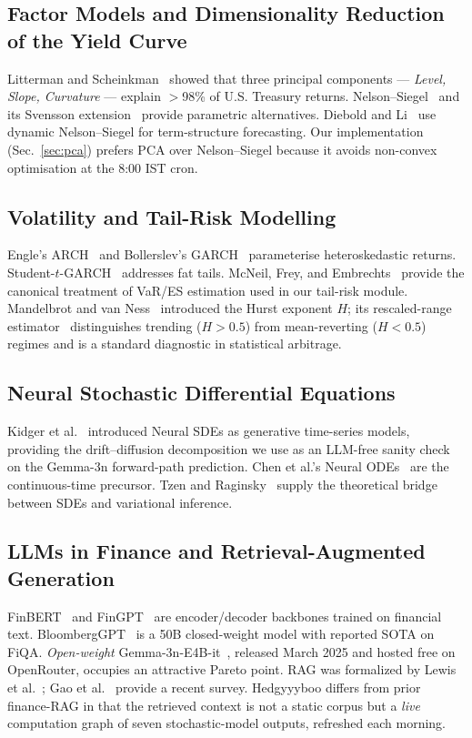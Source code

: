 \documentclass[conference]{IEEEtran}
\begin{document}
\subsection{Factor Models and Dimensionality Reduction of the Yield Curve}
Litterman and Scheinkman~\cite{litterman1991common} showed that three principal components --- \textit{Level, Slope, Curvature} --- explain $>$98\% of U.S. Treasury returns. Nelson--Siegel~\cite{nelsonsiegel1987} and its Svensson extension~\cite{svensson1994estimating} provide parametric alternatives. Diebold and Li~\cite{dieboldli2006forecasting} use dynamic Nelson--Siegel for term-structure forecasting. Our implementation (Sec.~\ref{sec:pca}) prefers PCA over Nelson--Siegel because it avoids non-convex optimisation at the 8:00 IST cron.

\subsection{Volatility and Tail-Risk Modelling}
Engle's ARCH~\cite{engle1982} and Bollerslev's GARCH~\cite{bollerslev1986} parameterise heteroskedastic returns. Student-$t$-GARCH~\cite{bollerslev1987conditionally} addresses fat tails. McNeil, Frey, and Embrechts~\cite{mcneil2015quantitative} provide the canonical treatment of VaR/ES estimation used in our tail-risk module. Mandelbrot and van Ness~\cite{mandelbrot1968fractional} introduced the Hurst exponent $H$; its rescaled-range estimator~\cite{hurst1951} distinguishes trending ($H>0.5$) from mean-reverting ($H<0.5$) regimes and is a standard diagnostic in statistical arbitrage.

\subsection{Neural Stochastic Differential Equations}
Kidger et al.~\cite{kidger2021neural} introduced Neural SDEs as generative time-series models, providing the drift--diffusion decomposition we use as an LLM-free sanity check on the Gemma-3n forward-path prediction. Chen et al.'s Neural ODEs~\cite{chen2018neural} are the continuous-time precursor. Tzen and Raginsky~\cite{tzen2019theoretical} supply the theoretical bridge between SDEs and variational inference.

\subsection{LLMs in Finance and Retrieval-Augmented Generation}
FinBERT~\cite{araci2019finbert} and FinGPT~\cite{yang2023fingpt} are encoder/decoder backbones trained on financial text. BloombergGPT~\cite{wu2023bloomberggpt} is a 50B closed-weight model with reported SOTA on FiQA. \textit{Open-weight} Gemma-3n-E4B-it~\cite{gemma2024technical}, released March 2025 and hosted free on OpenRouter, occupies an attractive Pareto point. RAG was formalized by Lewis et al.~\cite{lewis2020rag}; Gao et al.~\cite{gao2023ragsurvey} provide a recent survey. Hedgyyyboo differs from prior finance-RAG in that the retrieved context is not a static corpus but a \textit{live} computation graph of seven stochastic-model outputs, refreshed each morning.
\end{document}

